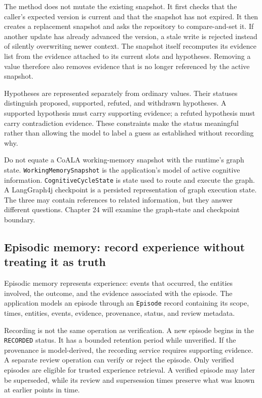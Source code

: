 The method does not mutate the existing snapshot. It first checks that the caller's expected version is current and that the snapshot has not expired. It then creates a replacement snapshot and asks the repository to compare-and-set it. If another update has already advanced the version, a stale write is rejected instead of silently overwriting newer context. The snapshot itself recomputes its evidence list from the evidence attached to its current slots and hypotheses. Removing a value therefore also removes evidence that is no longer referenced by the active snapshot.

Hypotheses are represented separately from ordinary values. Their statuses distinguish proposed, supported, refuted, and withdrawn hypotheses. A supported hypothesis must carry supporting evidence; a refuted hypothesis must carry contradiction evidence. These constraints make the status meaningful rather than allowing the model to label a guess as established without recording why.

\begin{tipbox}
Do not equate a CoALA working-memory snapshot with the runtime's graph state. \texttt{WorkingMemorySnapshot} is the application's model of active cognitive information. \texttt{CognitiveCycleState} is state used to route and execute the graph. A LangGraph4j checkpoint is a persisted representation of graph execution state. The three may contain references to related information, but they answer different questions. Chapter 24 will examine the graph-state and checkpoint boundary.
\end{tipbox}

\subsection{Episodic memory: record experience without treating it as truth}
\label{subsec:ch20-episodic-memory}

Episodic memory represents experience: events that occurred, the entities involved, the outcome, and the evidence associated with the episode. The application models an episode through an \texttt{Episode} record containing its scope, times, entities, events, evidence, provenance, status, and review metadata.

Recording is not the same operation as verification. A new episode begins in the \texttt{RECORDED} status. It has a bounded retention period while unverified. If the provenance is model-derived, the recording service requires supporting evidence. A separate review operation can verify or reject the episode. Only verified episodes are eligible for trusted experience retrieval. A verified episode may later be superseded, while its review and supersession times preserve what was known at earlier points in time.

